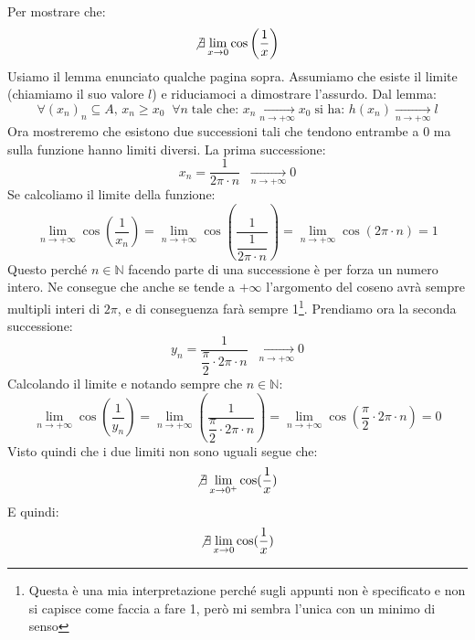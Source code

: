 \begin{itemize}
	Per mostrare che:
	\begin{equation*}
		\not \exists \lim_{x \to 0} \cos \left(\dfrac{1}{x}\right)
	\end{equation*}
	Usiamo il lemma enunciato qualche pagina sopra. Assumiamo che esiste il 
    limite (chiamiamo il suo valore $l$) e riduciamoci a dimostrare l'assurdo. 
    Dal lemma:
	\begin{equation*}
		\forall (x_n)_n \subseteq A, \, x_n \geq x_0 \;\; \forall n \; 
        \text{tale che: } x_n \xrightarrow[n \to + \infty]{} x_0 \; 
        \text{si ha: } h(x_n) \xrightarrow[n \to +\infty]{} l
	\end{equation*}
	Ora mostreremo che esistono due successioni tali che tendono entrambe a 
    $0$ ma sulla funzione hanno limiti diversi. La prima successione:
	\begin{equation*}
		x_n = \dfrac{1}{2 \pi \cdot n} \;\; \xrightarrow[n \to +\infty]{} 0
	\end{equation*}
	Se calcoliamo il limite della funzione:
	\begin{equation*}
		\lim_{n \to +\infty} \cos \left(\dfrac{1}{x_n}\right) = \lim_{n \to 
        +\infty} \cos \left(\dfrac{1}{\dfrac{1}{2 \pi \cdot n}}\right) = 
        \lim_{n \to +\infty} \cos(2\pi \cdot n) = 1
	\end{equation*}
	Questo perché $n \in \mathbb{N}$ facendo parte di una successione è per 
    forza un numero intero. Ne consegue che anche se tende a $+\infty$ 
    l'argomento del coseno avrà sempre multipli interi di $2\pi$, e di 
    conseguenza farà sempre 1\footnote{Questa è una mia interpretazione perché 
    sugli appunti non è specificato e non si capisce come faccia a fare 1, 
    però mi sembra l'unica con un minimo di senso}. Prendiamo ora la seconda 
    successione:
	\begin{equation*}
		y_n = \dfrac{1}{\dfrac{\pi}{2} \cdot 2\pi \cdot n} \;\; \xrightarrow[n 
        \to +\infty]{} 0
	\end{equation*}
	Calcolando il limite e notando sempre che $n \in \mathbb{N}$:
	\begin{equation*}
		\lim_{n \to +\infty} \cos \left( \dfrac{1}{y_n} \right) = \lim_{n \to 
        +\infty} \left(  \dfrac{1}{\dfrac{\pi}{2} \cdot 2\pi \cdot n} \right) = 
        \lim_{n \to +\infty} \cos \left( \dfrac{\pi}{2} \cdot 2\pi \cdot n 
        \right) = 0
	\end{equation*}
	Visto quindi che i due limiti non sono uguali segue che:
	\begin{equation*}
        \not \exists \lim_{x \to 0^+} \cos(\dfrac{1}{x}) 
	\end{equation*}
	E quindi:
	\begin{equation*}
        \not \exists \lim_{x \to 0} \cos(\dfrac{1}{x}) 
	\end{equation*}


\end{itemize}

